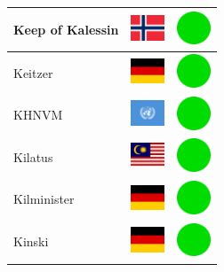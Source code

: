 \documentclass[12pt, a4paper, twoside]{report}
\begin{document}
\begin{center}
\begin{longtable}{|p{5cm}|p{2cm}|p{2cm}|}
 Keep of Kalessin                                           & \includegraphics[width=1cm]{../4x3/no} &   \includegraphics[width=1cm]{../likes/y} \\ \hline
 Keitzer                                                    & \includegraphics[width=1cm]{../4x3/de} &   \includegraphics[width=1cm]{../likes/y} \\ \hline
 KHNVM                                                      & \includegraphics[width=1cm]{../4x3/un} &   \includegraphics[width=1cm]{../likes/y} \\ \hline
 Kilatus                                                    & \includegraphics[width=1cm]{../4x3/my} &   \includegraphics[width=1cm]{../likes/y} \\ \hline
 Kilminister                                                & \includegraphics[width=1cm]{../4x3/de} &   \includegraphics[width=1cm]{../likes/y} \\ \hline
 Kinski                                                     & \includegraphics[width=1cm]{../4x3/de} &   \includegraphics[width=1cm]{../likes/y} \\ \hline

\end{longtable}
\end{center}
\end{document}
